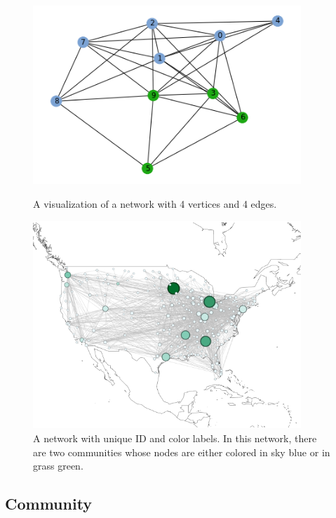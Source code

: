 \documentclass[12pt]{article}
\begin{document}
\bigskip
\begin{figure}
    \centering
    \begin{minipage}{0.45\textwidth}
        \centering
        \includegraphics[width=0.9\textwidth]{fig_1.png} %
        \caption{\label{fig:fig_1} A visualization of a network with 4 vertices and 4 edges.}
    \end{minipage}\hfill
    \begin{minipage}{0.45\textwidth}
        \centering
        \includegraphics[width=0.9\textwidth]{fig_2.png} %
        \caption{\label{fig:fig_2}A network with unique ID and color labels. In this network, there are two communities whose nodes are either colored in sky blue or in grass green.}
    \end{minipage}
\end{figure}


\subsection{Community}
\end{document}
